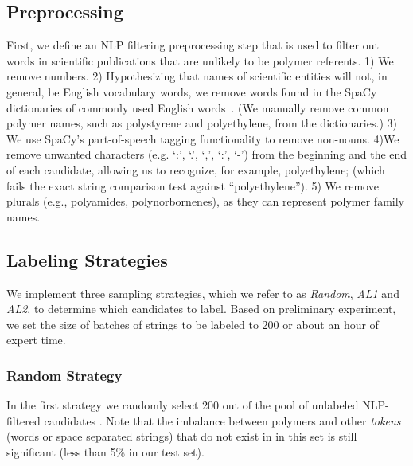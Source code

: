 \subsection{Preprocessing}
First, we define an
NLP filtering preprocessing step that is used to filter out
words in scientific publications that are unlikely to be polymer referents. 1) We remove numbers. 2)
Hypothesizing that names of scientific entities will not, in general, be English
vocabulary words, we remove words found in the SpaCy dictionaries
of commonly used English words~\cite{choi2015depends}. (We manually remove common polymer
names, such as polystyrene and polyethylene, from the dictionaries.) 3) We use
SpaCy's part-of-speech tagging functionality to remove non-nouns. 4)We remove
unwanted characters (e.g. `:', `.', `,', `:', `-') from the beginning and the end of each
candidate, allowing us to recognize, for example, polyethylene; (which fails the
exact string comparison test against ``polyethylene''). 5) We remove plurals (e.g.,
polyamides, polynorbornenes), as they can represent polymer family names.


\subsection{Labeling Strategies}

We implement three sampling strategies, which we refer to as \textit{Random}, \textit{AL1} and \textit{AL2}, 
to determine which candidates to label.
Based on preliminary experiment, we set the size of batches of strings to be labeled to 200 or about an hour of expert time.

\subsubsection{Random Strategy}
In the first strategy we randomly select 200 out of the pool of unlabeled NLP-filtered candidates . Note that the imbalance between polymers and other \textit{tokens} (words or space separated strings) that do not exist in in this set is still significant (less than 5\% in our test set).

